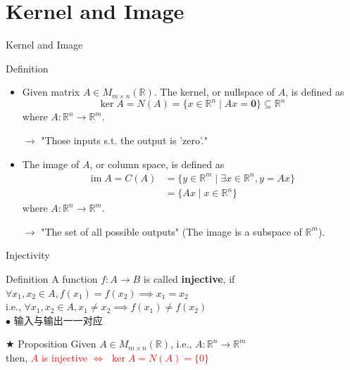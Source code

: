 \documentclass[aspectratio=169, UTF8]{ctexbeamer}
\begin{document}
\section{Kernel and Image}
\begin{frame}{Kernel and Image}
    \begin{block}{Definition}
        \begin{itemize}
            \item Given matrix $A \in M_{m \times n}(\mathbb{R})$. The kernel, or nullspace of $A$, is defined as
                  \[
                      \operatorname{ker} A = N(A) = \{x \in \mathbb{R}^n \mid Ax = \mathbf{0}\} \subseteq \mathbb{R}^n
                  \]
                  where $A: \mathbb{R}^n \rightarrow \mathbb{R}^m$.

                  $\rightarrow$ "Those inputs s.t. the output is 'zero'."

            \item The image of $A$, or column space, is defined as
                  \begin{align*}
                      \operatorname{im} A = C(A) & = \{y \in \mathbb{R}^m \mid \exists x \in \mathbb{R}^n, y = Ax\} \\
                                                 & = \{Ax \mid x \in \mathbb{R}^n\}
                  \end{align*}
                  where $A: \mathbb{R}^n \rightarrow \mathbb{R}^m$.

                  $\rightarrow$ "The set of all possible outputs"
                  \newline
                  (The image is a subspace of $\mathbb{R}^m$).
        \end{itemize}
    \end{block}
\end{frame}

\begin{frame}{Injectivity}
    \begin{block}{Definition}
        A function $f: A \to B$ is called \textbf{injective}, if \\
        $\forall x_1, x_2 \in A, f(x_1) = f(x_2) \implies x_1 = x_2$ \\
        i.e., $\forall x_1, x_2 \in A, x_1 \neq x_2 \implies f(x_1) \neq f(x_2)$
        \\
        $\bullet$ 输入与输出一一对应
    \end{block}
    \begin{block}{$\bigstar$ Proposition}
        Given $A \in M_{m \times n}(\mathbb{R})$, i.e., $A: \mathbb{R}^n \to \mathbb{R}^m$ \\
        then, \textcolor{red}{$A$ is injective $\iff$ $\ker A = N(A) = \{0\}$}
    \end{block}
\end{frame}
\end{document}
